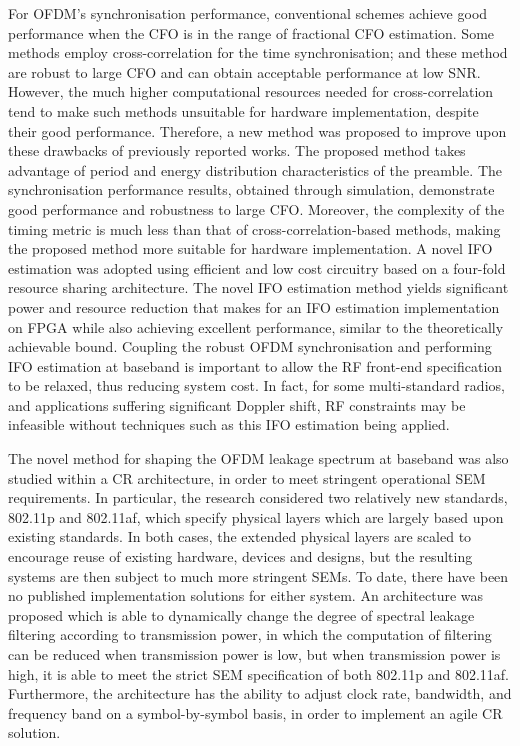 For OFDM's synchronisation performance, conventional schemes achieve good performance when the CFO is in the range of fractional CFO estimation. 
Some methods employ cross-correlation for the time synchronisation; and these method are robust to large CFO and can obtain acceptable performance at low SNR.
However, the much higher computational resources needed for cross-correlation tend to make such methods unsuitable for hardware implementation, despite their good performance. 
Therefore, a new method was proposed to improve upon these drawbacks of previously reported works. 
The proposed method takes advantage of period and energy distribution characteristics of the preamble. 
The synchronisation performance results, obtained through simulation, demonstrate good performance and robustness to large CFO. 
Moreover, the complexity of the timing metric is much less than that of cross-correlation-based methods, making the proposed method more suitable for hardware implementation.
A novel IFO estimation was adopted using efficient and low cost circuitry based on a four-fold resource sharing architecture. 
The novel IFO estimation method yields significant power and resource reduction that makes for an IFO estimation implementation on FPGA while also achieving excellent performance, similar to the theoretically achievable bound.
Coupling the robust OFDM synchronisation and performing IFO estimation at baseband is important to allow the RF front-end
specification to be relaxed, thus reducing system cost. In fact, for some multi-standard radios, and applications suffering significant Doppler shift, RF constraints may be infeasible
without techniques such as this IFO estimation being applied.

The novel method for shaping the OFDM leakage spectrum at baseband was also studied within a CR architecture, in order to meet stringent operational SEM requirements. 
In particular, the research considered two relatively new standards, 802.11p and 802.11af, which specify physical layers which are largely based upon existing standards.
In both cases, the extended physical layers are scaled to encourage reuse of existing hardware, devices and designs, but the resulting systems are then subject to much more stringent SEMs.
To date, there have been no published implementation solutions for either system. 
An architecture was proposed which is able to dynamically change the degree of spectral leakage filtering according to transmission power, in which the computation of filtering can be reduced when transmission power is low, but when transmission power is high, it is able to meet the strict SEM specification of both 802.11p and 802.11af. 
Furthermore, the architecture has the ability to adjust clock rate, bandwidth, and frequency band on a symbol-by-symbol basis, in order to implement an agile CR solution.


